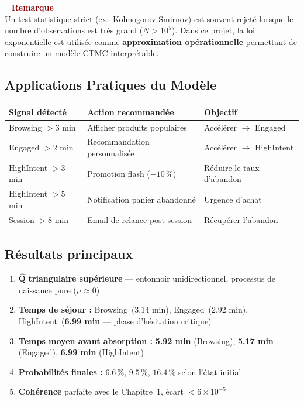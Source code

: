 \documentclass[11pt,a4paper]{article}
\renewcommand{\arraystretch}{1.35}
\newenvironment{warnbox}{%
  \vspace{3pt}\begin{framed}
  \noindent{\color{DarkRed}\rule{0.3cm}{3pt}}~%
  \textcolor{DarkRed}{\textbf{Remarque}}\\[3pt]}
  {\end{framed}\vspace{3pt}}
\newcommand{\mat}[1]{\mathbf{#1}}
\begin{document}
\begin{warnbox}
Un test statistique strict (ex.\ Kolmogorov-Smirnov) est souvent rejeté lorsque le nombre
d'observations est très grand ($N > 10^5$). Dans ce projet, la loi exponentielle est utilisée
comme \textbf{approximation opérationnelle} permettant de construire un modèle CTMC interprétable.
\end{warnbox}

\subsection{Applications Pratiques du Modèle}

\begin{center}
\renewcommand{\arraystretch}{1.4}
\begin{tabular}{lll}
\toprule
\textbf{Signal détecté} & \textbf{Action recommandée} & \textbf{Objectif} \\
\midrule
\rowcolor{LightBlue}   Browsing $> 3$ min & Afficher produits populaires & Accélérer $\to$ Engaged \\
\rowcolor{LightOrange} Engaged $> 2$ min & Recommandation personnalisée & Accélérer $\to$ HighIntent \\
\rowcolor{LightRed}    HighIntent $> 3$ min & Promotion flash ($-10\,\%$) & Réduire le taux d'abandon \\
\rowcolor{LightRed}    HighIntent $> 5$ min & Notification panier abandonné & Urgence d'achat \\
\rowcolor{LightGray}   Session $> 8$ min & Email de relance post-session & Récupérer l'abandon \\
\bottomrule
\end{tabular}
\end{center}

\subsection{Résultats principaux}

\begin{enumerate}[leftmargin=2cm,itemsep=3pt]
  \item $\hat{\mat{Q}}$ \textbf{triangulaire supérieure} --- entonnoir unidirectionnel,
  processus de naissance pure ($\mu \approx 0$)
  \item \textbf{Temps de séjour :} Browsing~(3.14 min), Engaged~(2.92 min),
  HighIntent~(\textbf{6.99 min} --- phase d'hésitation critique)
  \item \textbf{Temps moyen avant absorption :} \textbf{5.92 min} (Browsing),
  \textbf{5.17 min} (Engaged), \textbf{6.99 min} (HighIntent)
  \item \textbf{Probabilités finales :} $6.6\,\%$, $9.5\,\%$, $\mathbf{16.4\,\%}$
  selon l'état initial
  \item \textbf{Cohérence} parfaite avec le Chapitre~1, écart $<6\times10^{-5}$
\end{enumerate}
\end{document}
